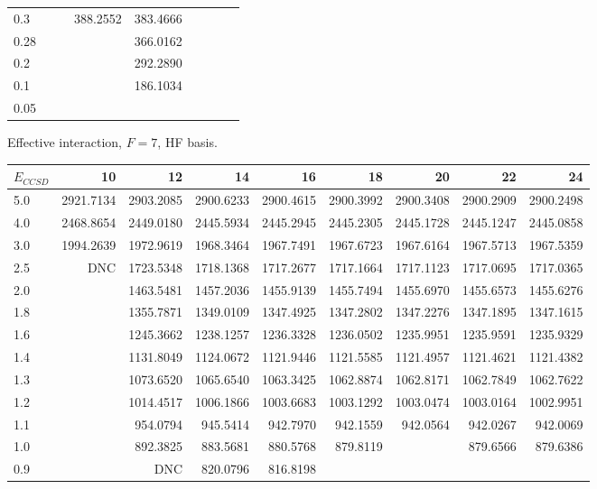 \begin{landscape}
\begin{table}
\begin{center}
\begin{tabular}{l|rrrrrrrr}
0.3 &			&			&  388.2552 &  383.4666  \\ 
0.28 &			&			&			&  366.0162  \\ 
0.2 &			&			&			&  292.2890  \\ 
0.1 &			&			&			&  186.1034  \\ 
0.05 & \\
\hline \hline
\end{tabular}
\end{center}
\end{table}
\begin{table}
\begin{center}
Effective interaction, $F=7$, HF basis.\\
\begin{tabular}{l|rrrrrrrr}
\hline 
$E_{CCSD}$ & 10 & 12 & 14 & 16 & 18 & 20 & 22 & 24 \\
\hline \hline
5.0 & 2921.7134 & 2903.2085 & 2900.6233 & 2900.4615 & 2900.3992 & 2900.3408 & 2900.2909 & 2900.2498 \\ 
4.0 & 2468.8654 & 2449.0180 & 2445.5934 & 2445.2945 & 2445.2305 & 2445.1728 & 2445.1247 & 2445.0858 \\ 
3.0 & 1994.2639 & 1972.9619 & 1968.3464 & 1967.7491 & 1967.6723 & 1967.6164 & 1967.5713 & 1967.5359 \\ 
2.5 &       DNC & 1723.5348 & 1718.1368 & 1717.2677 & 1717.1664 & 1717.1123 & 1717.0695 & 1717.0365 \\ 
2.0 &			& 1463.5481 & 1457.2036 & 1455.9139 & 1455.7494 & 1455.6970 & 1455.6573 & 1455.6276 \\ 
1.8 &			& 1355.7871 & 1349.0109 & 1347.4925 & 1347.2802 & 1347.2276 & 1347.1895 & 1347.1615 \\ 
1.6 &			& 1245.3662 & 1238.1257 & 1236.3328 & 1236.0502 & 1235.9951 & 1235.9591 & 1235.9329 \\ 
1.4 &			& 1131.8049 & 1124.0672 & 1121.9446 & 1121.5585 & 1121.4957 & 1121.4621 & 1121.4382 \\ 
1.3 &			& 1073.6520 & 1065.6540 & 1063.3425 & 1062.8874 & 1062.8171 & 1062.7849 & 1062.7622 \\ 
1.2 &			& 1014.4517 & 1006.1866 & 1003.6683 & 1003.1292 & 1003.0474 & 1003.0164 & 1002.9951 \\ 
1.1 &			&  954.0794 &  945.5414 &  942.7970 &  942.1559 & 942.0564  &  942.0267 &  942.0069 \\ 
1.0 &			&  892.3825 &  883.5681 &  880.5768 &  879.8119 &           &  879.6566 &  879.6386 \\ 
0.9 &			&  DNC      &  820.0796 &  816.8198 &  \\ 

\end{tabular}
\end{center}
\end{table}
\end{landscape}
